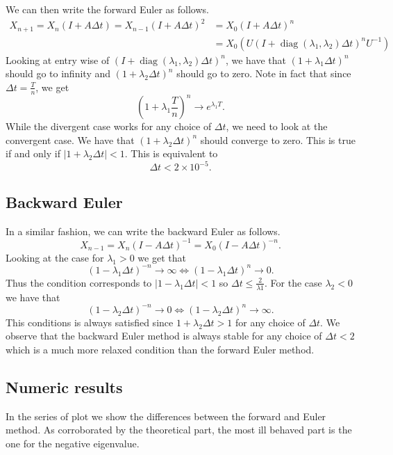\documentclass[a4paper,12pt]{article} %
\DeclareMathOperator{\diag}{diag}
\begin{document}
We can then write the forward Euler as follows.
\begin{align*}
    X_{n+1}  = X_n (I+ A \Delta t) = X_{n-1}(I+A \Delta t)^{2} & = X_0 (I+A \Delta t)^n                                       \\
                                                               & = X_0 (U (I+ \diag(\lambda_1, \lambda_2) \Delta t)^n U^{-1})
\end{align*}
Looking at entry wise of \((I+  \diag(\lambda_1, \lambda_2) \Delta t)^n \), we have that \((1+\lambda_1 \Delta t)^n\) should go to infinity and \((1+\lambda_2 \Delta t)^n\) should go to zero. Note in fact that since \(\Delta t= \frac{T}{n}\), we get
\begin{equation}
    \left(  1+\lambda_1 \frac{T}{n} \right)^n \to e^{\lambda _1 T}.
\end{equation}
While the divergent case works for any choice of \(\Delta t\), we need to look at the convergent case. We have that
\((1+\lambda _2 \Delta t)^n \) should converge to zero. This is true if and only if \( |1+ \lambda _2 \Delta t| <1 \). This is equivalent to
\begin{equation}
    \Delta t < 2 \times 10^{-5}.
\end{equation}
\subsection{Backward Euler}
In a similar fashion, we can write the backward Euler as follows.
\begin{equation}
    X_{n-1} = X_n (I-A \Delta t)^{-1} = X_0 (I-A \Delta t)^{-n}.
\end{equation}
Looking at the case for \(\lambda _1 >0\) we get that
\begin{equation}
    (1-\lambda _1 \Delta t)^{-n} \to \infty  \iff (1-\lambda _1 \Delta t)^n \to 0.
\end{equation}
Thus the condition corresponds to \(|1-\lambda _1\Delta t|<1\)  so \(\Delta t \leq \frac{2}{\lambda 1}\).
For the case \(\lambda _2 <0 \) we have that
\begin{equation}
    (1-\lambda _2 \Delta t)^{-n} \to 0  \iff (1-\lambda _2 \Delta t)^n \to \infty.
\end{equation}
This conditions is always satisfied since \(1+\lambda_2 \Delta t >1 \) for any choice of \(\Delta t\).
We observe that the backward Euler method is always stable for any choice of \(\Delta t<2\) which is a much more relaxed condition than the forward Euler method.
\subsection{Numeric results}
In the series of plot we show the differences between the forward and Euler method. As corroborated by the theoretical part, the most ill behaved part is the one for the negative eigenvalue.
\end{document}

